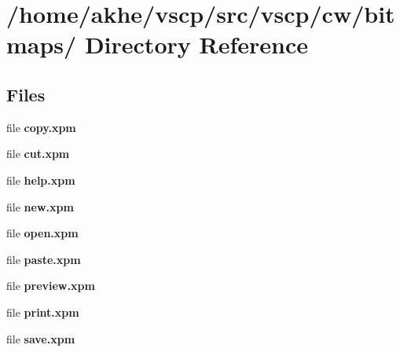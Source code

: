 \section{/home/akhe/vscp/src/vscp/cw/bitmaps/ Directory Reference}
\label{dir_783de671e0340019e7bcfcd894abbe21}
\subsection*{Files}
\begin{CompactItemize}
\item 
file \textbf{copy.xpm}
\item 
file \textbf{cut.xpm}
\item 
file \textbf{help.xpm}
\item 
file \textbf{new.xpm}
\item 
file \textbf{open.xpm}
\item 
file \textbf{paste.xpm}
\item 
file \textbf{preview.xpm}
\item 
file \textbf{print.xpm}
\item 
file \textbf{save.xpm}
\end{CompactItemize}
